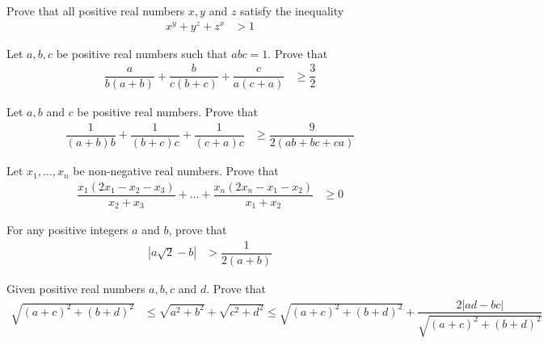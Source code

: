 \documentclass{subfile}
\begin{document}
		\begin{problem}[$2010$ Test $7$]
			Prove that all positive real numbers $x,y$ and $z$ satisfy the inequality
				\begin{align*}
					x^{y}+y^{z}+z^{x}
						& > 1
				\end{align*}
		\end{problem}
	
		\begin{problem}[$2010$ Test $8$]
			Let $a,b,c$ be positive real numbers such that $abc=1$. Prove that
				\begin{align*}
					\dfrac{a}{b(a+b)}+\dfrac{b}{c(b+c)}+\dfrac{c}{a(c+a)}
						& \geq \dfrac{3}{2}
				\end{align*}
		\end{problem}
	
		\begin{problem}
			Let $a,b$ and $c$ be positive real numbers. Prove that
				\begin{align*}
					\dfrac{1}{(a+b)b}+\dfrac{1}{(b+c)c}+\dfrac{1}{(c+a)c}
						& \geq \dfrac{9}{2(ab+bc+ca)}
				\end{align*}
		\end{problem}
	
		\begin{problem}
			Let $x_{1},\ldots,x_{n}$ be non-negative real numbers. Prove that
				\begin{align*}
					\dfrac{x_{1}(2x_{1}-x_{2}-x_{3})}{x_{2}+x_{3}}+\ldots+\dfrac{x_{n}(2x_{n}-x_{1}-x_{2})}{x_{1}+x_{2}}
						& \geq0
				\end{align*}
		\end{problem}
	
		\begin{problem}[$2002$]
			For any positive integers $a$ and $b$, prove that
				\begin{align*}
					|a\sqrt{2}-b|
						& > \dfrac{1}{2(a+b)}
				\end{align*}
		\end{problem}
	
		\begin{problem}[$2002$]
			Given positive real numbers $a,b,c$ and $d$. Prove that
				\begin{align*}
					\sqrt{(a+c)^{2}+(b+d)^{2}}
						& \leq \sqrt{a^{2}+b^{2}}+\sqrt{c^{2}+d^{2}}\leq \sqrt{(a+c)^{2}+(b+d)^{2}}+\dfrac{2|ad-bc|}{\sqrt{(a+c)^{2}+(b+d)^{2}}}
				\end{align*}
		\end{problem}
\end{document}
